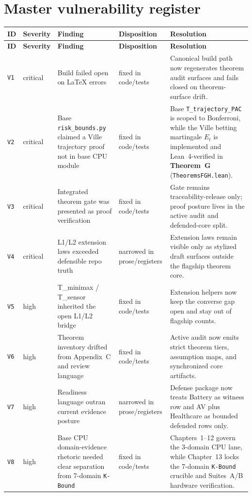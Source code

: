 \documentclass[11pt,oneside]{report}
\begin{document}
\section*{Master vulnerability register}
\begin{longtable}{p{}p{}p{}p{}p{}}
\toprule
\textbf{ID} & \textbf{Severity} & \textbf{Finding} & \textbf{Disposition} & \textbf{Resolution}\\
\midrule
\endfirsthead
\toprule
\textbf{ID} & \textbf{Severity} & \textbf{Finding} & \textbf{Disposition} & \textbf{Resolution}\\
\midrule
\endhead
\texttt{V1} & critical & Build failed open on LaTeX errors & fixed in code/tests & Canonical build path now regenerates theorem audit surfaces and fails closed on theorem-surface drift.\\
\texttt{V2} & critical & Base \texttt{risk\_bounds.py} claimed a Ville trajectory proof not in base CPU module & fixed in code/tests & Base \texttt{T\_trajectory\_PAC} is scoped to Bonferroni, while the Ville betting martingale $E_t$ is implemented and Lean~4-verified in \textbf{Theorem~G} (\texttt{TheoremsFGH.lean}).\\
\texttt{V3} & critical & Integrated theorem gate was presented as proof verification & fixed in code/tests & Gate remains traceability-release only; proof posture lives in the active audit and defended-core split.\\
\texttt{V4} & critical & L1/L2 extension laws exceeded defensible repo truth & narrowed in prose/registers & Extension laws remain visible only as stylized draft surfaces outside the flagship theorem core.\\
\texttt{V5} & high & T\_minimax / T\_sensor inherited the open L1/L2 bridge & fixed in code/tests & Extension helpers now keep the converse gap open and stay out of flagship counts.\\
\texttt{V6} & high & Theorem inventory drifted from Appendix~C and review language & fixed in code/tests & Active audit now emits strict theorem tiers, assumption maps, and synchronized core artifacts.\\
\texttt{V7} & high & Readiness language outran current evidence posture & narrowed in prose/registers & Defense package now treats Battery as witness row and AV plus Healthcare as bounded defended rows only.\\
\texttt{V8} & high & Base CPU domain-evidence rhetoric needed clear separation from 7-domain \texttt{K-Bound} & fixed in code/tests & Chapters~1--12 govern the 3-domain CPU lane, while Chapter~13 locks the 7-domain \texttt{K-Bound} crucible and Suites~A/B hardware verification.\\

\end{longtable}
\end{document}
